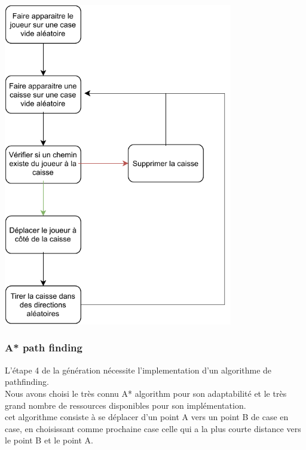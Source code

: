 \documentclass[../main.tex]{subfiles}
\begin{document}
\begin{center}
\includegraphics[width=0.75\textwidth]{images/generation.pdf}
\end{center}

\subsubsection{A* path finding}
L'étape 4 de la génération nécessite l'implementation d'un algorithme de pathfinding.\\
Nous avons choisi le très connu A* algorithm pour son adaptabilité et le très grand nombre de ressources disponibles pour son implémentation.\\
cet algorithme consiste à se déplacer d'un point A vers un point B de case en case, en choisissant comme prochaine case celle qui a la plus courte distance vers le point B 
et le point A.
\end{document}
